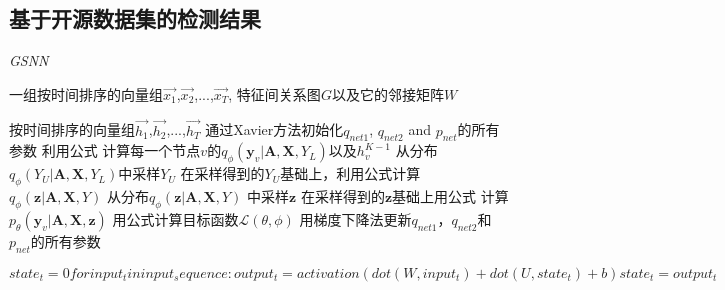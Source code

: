 \subsection{基于开源数据集的检测结果}
\begin{algorithm}[!h]
    \caption{\emph{GSNN}}
    \label{alg}
    \begin{algorithmic}[1]
      \Require
        一组按时间排序的向量组$\vec{x_1}$,$\vec{x_2}$,...,$\vec{x_T}$, 特征间关系图$G$以及它的邻接矩阵$W$

      \Ensure
        按时间排序的向量组$\vec{h_1}$,$\vec{h_2}$,...,$\vec{h_T}$
      \State 通过Xavier方法初始化$q_{net1}$, $q_{net2}$ and $p_{net}$的所有参数
          \State 利用公式 计算每一个节点$v$的$q_\phi(\bm{y}_v | \bm{A}, \bm{X}, Y_L)$以及$h_v^{K-1}$
          \State 从分布$q_\phi(Y_U | \bm{A}, \bm{X}, Y_L)$中采样$Y_U$
          \State 在采样得到的$Y_U$基础上，利用公式计算$q_\phi(\bm{z}| \bm{A}, \bm{X}, Y)$ 
           \State 从分布$q_\phi(\bm{z}| \bm{A}, \bm{X}, Y)$ 中采样$\bm{z}$
           \State 在采样得到的$\bm{z}$基础上用公式 计算$p_{\theta}(\bm{y}_v|\bm{A}, \bm{X}, \bm{z})$
           \EndFor
          \EndFor
          \State 用公式计算目标函数$\mathcal{L}(\theta, \phi)$ 
          \State 用梯度下降法更新$q_{net1}$，$q_{net2}$和$p_{net}$的所有参数
      \EndWhile
    \end{algorithmic}
  \end{algorithm}



$  state_t = 0
  for input_t in input_sequence:
    output_t = activation(dot(W, input_t) + dot(U, state_t) + b)
    state_t = output_t$

